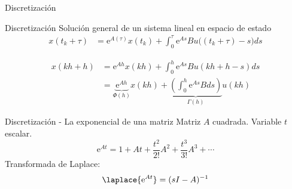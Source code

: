 \documentclass[presentation,aspectratio=1610]{beamer}
\begin{document}
\begin{frame}[label={sec:org70b86e0}]{Discretización}
\end{frame}
\begin{frame}[label={sec:org03e5974}]{Discretización}
Solución general de un sistema lineal en espacio de estado 
\begin{align*}
x(t_k+\tau)& = \mathrm{e}^{A(\tau)} x(t_k) + \int_{0}^\tau \mathrm{e}^{As} B u\big((t_k+\tau)-s) ds
\end{align*}

\begin{center}
\end{center}

 \begin{align*}
  x(kh+h) &= \mathrm{e}^{Ah} x(kh) + \int_{0}^{h} \mathrm{e}^{As} B u(kh+h-s) ds\\
   &= \underbrace{\mathrm{e}^{Ah}}_{\Phi(h)} x(kh) + \underbrace{\left(\int_{0}^h \mathrm{e}^{As} B ds \right)}_{\Gamma(h)} u(kh)
\end{align*}
\end{frame}

\begin{frame}[label={sec:orge27338d}]{Discretización - La exponencial de una matriz}
Matriz \(A\) cuadrada. Variable \(t\) escalar.
\[ \mathrm{e}^{At} = 1 + At + \frac{t^2}{2!}A^2 + \frac{t^3}{3!} A^3 + \cdots\]
Transformada de Laplace:
\[ \laplace{\mathrm{e}^{At}} = (sI - A)^{-1}\]
\end{frame}
\end{document}
